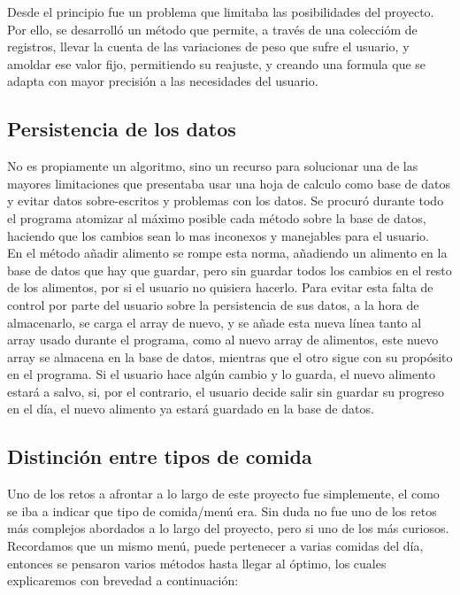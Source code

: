 Desde el principio fue un problema que limitaba las posibilidades del proyecto. Por ello, se desarrolló un método que permite, a través de una coleccióm de registros, llevar la cuenta de las variaciones de peso que sufre el usuario, y amoldar ese valor fijo, permitiendo su reajuste, y creando una formula que se adapta con mayor precisión a las necesidades del usuario.\\

\subsection{Persistencia de los datos}
No es propiamente un algoritmo, sino  un recurso para solucionar una de las mayores limitaciones que presentaba usar una hoja de calculo como base de datos y evitar  datos sobre-escritos y problemas con los datos. Se procuró durante todo el programa atomizar al máximo posible cada método sobre la base de datos, haciendo que los cambios sean lo mas inconexos y manejables para el usuario. \\

En el método añadir alimento se rompe esta norma, añadiendo un alimento en la base de datos que hay que guardar, pero sin guardar todos los cambios en el resto de los alimentos, por si el usuario no quisiera hacerlo. Para evitar esta falta de control por parte del usuario sobre la persistencia de sus datos, a la hora de almacenarlo, se carga el array de nuevo, y se añade esta nueva línea tanto al array usado durante el programa, como al nuevo array de alimentos, este nuevo array se almacena en la base de datos, mientras que el otro sigue con su propósito en el programa. Si el usuario hace algún cambio y lo guarda, el nuevo alimento estará a salvo, si, por el contrario, el usuario decide salir sin guardar su progreso en el día, el nuevo alimento ya estará guardado en la base de datos.\\
\subsection{Distinción entre tipos de comida}
Uno de los retos a afrontar a lo largo de este proyecto fue simplemente, el como se iba a indicar que tipo de comida/menú era. Sin duda no fue uno de los retos más complejos abordados a lo largo del proyecto, pero si uno de los más curiosos.\\

Recordamos que un mismo menú, puede pertenecer a varias comidas del día, entonces se pensaron varios métodos hasta llegar al óptimo, los cuales explicaremos con brevedad a continuación:\\

